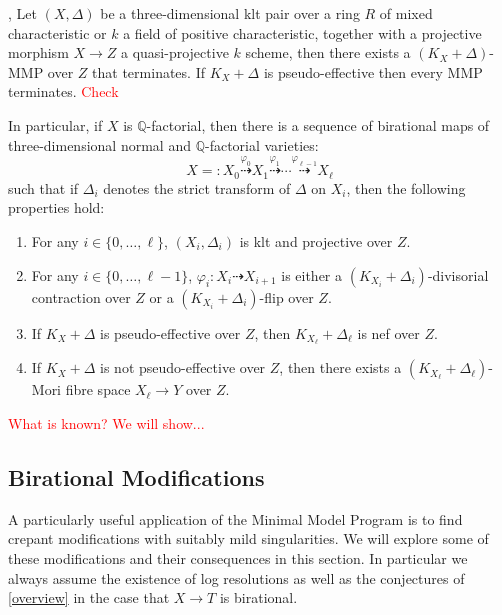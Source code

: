 \documentclass[a4paper,12pt]{book}
\newcommand\myworries[1]{\textcolor{red}{#1}}
\begin{document}
	\begin{theorem}\cite[Theorem 1.7]{BW17}, \cite[Theorem 1.2]{BW17}\cite[Theorem F]{bhatt2020}\label{MMP}
	Let $(X, \Delta)$ be a three-dimensional klt pair over a ring $R$ of mixed characteristic or $k$ a field of positive characteristic, together with a projective morphism $X \to Z$ a quasi-projective $k$ scheme, then there exists a $(K_X+\Delta)$-MMP over $Z$ that terminates. If $K_{X}+\Delta$ is pseudo-effective then every MMP terminates. \myworries{Check}
	
	In particular, if $X$ is $\mathbb{Q}$-factorial, then 
	there is a sequence of birational maps of three-dimensional normal and $\mathbb{Q}$-factorial varieties:  
	\[
	X=:X_0 \overset{\varphi_0}{\dashrightarrow} X_1 \overset{\varphi_1}{\dashrightarrow} \cdots \overset{\varphi_{\ell-1}}{\dashrightarrow} X_{\ell}
	\]
	such that if $\Delta_i$ denotes the strict transform of $\Delta$ on $X_i$, then
	the following properties hold:  
	\begin{enumerate}
		\item 
		For any $i \in \{0, \ldots, \ell\}$, 
		$(X_i, \Delta_i)$ is klt and projective over $Z$.
		\item 
		For any $i \in \{0, \ldots, \ell-1\}$, 
		$\varphi_i\colon X_i \dashrightarrow X_{i+1}$ is either a $(K_{X_i}+\Delta_i)$-divisorial contraction over $Z$ or a $(K_{X_i}+\Delta_i)$-flip over $Z$. 
		\item 
		If $K_X+\Delta$ is pseudo-effective over $Z$, then $K_{X_{\ell}}+\Delta_{\ell}$ is nef over $Z$. 
		\item 
		If $K_X+\Delta$ is not pseudo-effective over $Z$, then 
		there exists a $(K_{X_{\ell}}+\Delta_{\ell})$-Mori fibre space $X_{\ell} \to Y$ over $Z$. 
	\end{enumerate}
\end{theorem}


\myworries{What is known? We will show...}


\subsection{Birational Modifications}

A particularly useful application of the Minimal Model Program is to find crepant modifications with suitably mild singularities. We will explore some of these modifications and their consequences in this section. In particular we always assume the existence of log resolutions as well as the conjectures of \autoref{overview} in the case that $X \to T$ is birational.
\end{document}
